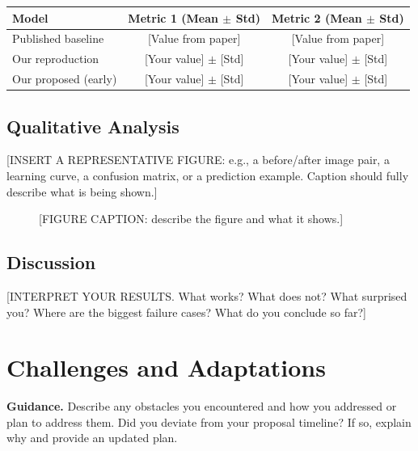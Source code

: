 \documentclass[11pt, letterpaper]{article}
\begin{document}
\begin{center}
\begin{tabular}{lcc}
\toprule
\textbf{Model} & \textbf{Metric 1 (Mean $\pm$ Std)} & \textbf{Metric 2 (Mean $\pm$ Std)} \\
\midrule
Published baseline & [Value from paper] & [Value from paper] \\
Our reproduction & [Your value] $\pm$ [Std] & [Your value] $\pm$ [Std] \\
Our proposed (early) & [Your value] $\pm$ [Std] & [Your value] $\pm$ [Std] \\
\bottomrule
\end{tabular}
\end{center}

\subsection{Qualitative Analysis}

[INSERT A REPRESENTATIVE FIGURE: e.g., a before/after image pair, a learning
curve, a confusion matrix, or a prediction example. Caption should fully
describe what is being shown.]

\begin{figure}[h]
  \centering
  \caption{[FIGURE CAPTION: describe the figure and what it shows.]}
  \label{fig:qual}
\end{figure}

\subsection{Discussion}

[INTERPRET YOUR RESULTS. What works? What does not? What surprised you?
Where are the biggest failure cases? What do you conclude so far?]

\section{Challenges and Adaptations}

\begin{guidancebox}
\textbf{Guidance.} Describe any obstacles you encountered and how you
addressed or plan to address them. Did you deviate from your proposal timeline?
If so, explain why and provide an updated plan.
\end{guidancebox}
\end{document}
